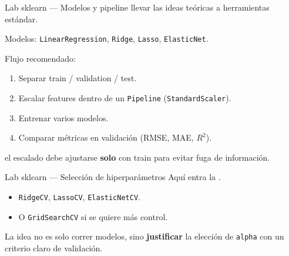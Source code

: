 \begin{frame}{Lab sklearn — Modelos y pipeline}
 llevar las ideas teóricas a herramientas estándar.

\vspace{0.2em}
Modelos: \texttt{LinearRegression}, \texttt{Ridge}, \texttt{Lasso}, \texttt{ElasticNet}.

\vspace{0.2em}
Flujo recomendado:
\begin{enumerate}\footnotesize
  \item Separar train / validation / test.
  \item Escalar features dentro de un \texttt{Pipeline} (\texttt{StandardScaler}).
  \item Entrenar varios modelos.
  \item Comparar métricas en validación (RMSE, MAE, $R^2$).
\end{enumerate}

\vspace{0.15em}
{\footnotesize {} el escalado debe ajustarse \textbf{solo} con train para evitar fuga de información.}
\end{frame}

\begin{frame}{Lab sklearn — Selección de hiperparámetros}
Aquí entra la .
\begin{itemize}\small
  \item \texttt{RidgeCV}, \texttt{LassoCV}, \texttt{ElasticNetCV}.
  \item O \texttt{GridSearchCV} si se quiere más control.
\end{itemize}

\vspace{0.3em}
La idea no es solo correr modelos, sino \textbf{justificar} la elección de \texttt{alpha} con un criterio claro de validación.
\end{frame}

